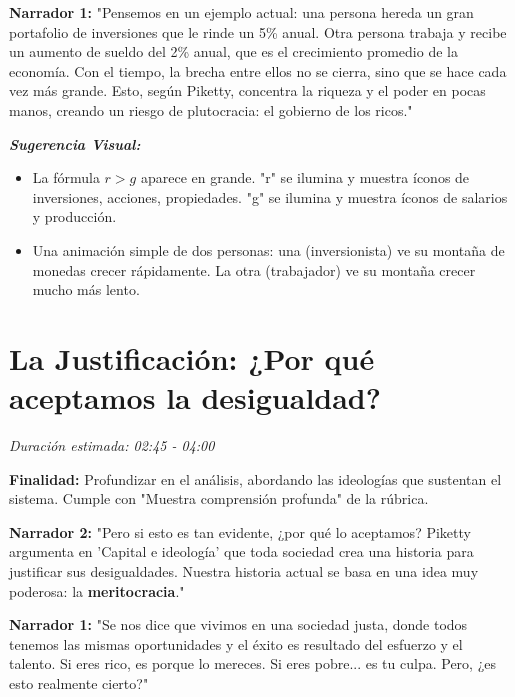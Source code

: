 \documentclass[12pt, a4paper]{article}
\begin{document}
\vspace{0.5cm}

\textbf{Narrador 1:}
"Pensemos en un ejemplo actual: una persona hereda un gran portafolio de inversiones que le rinde un 5\% anual. Otra persona trabaja y recibe un aumento de sueldo del 2\% anual, que es el crecimiento promedio de la economía. Con el tiempo, la brecha entre ellos no se cierra, sino que se hace cada vez más grande. Esto, según Piketty, concentra la riqueza y el poder en pocas manos, creando un riesgo de plutocracia: el gobierno de los ricos."

\vspace{0.5cm}

\textit{\textbf{Sugerencia Visual:}} 
\begin{itemize}
    \item La fórmula \(r > g\) aparece en grande. "r" se ilumina y muestra íconos de inversiones, acciones, propiedades. "g" se ilumina y muestra íconos de salarios y producción.
    \item Una animación simple de dos personas: una (inversionista) ve su montaña de monedas crecer rápidamente. La otra (trabajador) ve su montaña crecer mucho más lento.
\end{itemize}


\section{La Justificación: ¿Por qué aceptamos la desigualdad?}
\textit{Duración estimada: 02:45 - 04:00}

\textbf{Finalidad:} Profundizar en el análisis, abordando las ideologías que sustentan el sistema. Cumple con "Muestra comprensión profunda" de la rúbrica.

\vspace{0.5cm}

\textbf{Narrador 2:}
"Pero si esto es tan evidente, ¿por qué lo aceptamos? Piketty argumenta en 'Capital e ideología' que toda sociedad crea una historia para justificar sus desigualdades. Nuestra historia actual se basa en una idea muy poderosa: la \textbf{meritocracia}."

\vspace{0.5cm}

\textbf{Narrador 1:}
"Se nos dice que vivimos en una sociedad justa, donde todos tenemos las mismas oportunidades y el éxito es resultado del esfuerzo y el talento. Si eres rico, es porque lo mereces. Si eres pobre... es tu culpa. Pero, ¿es esto realmente cierto?"
\end{document}
